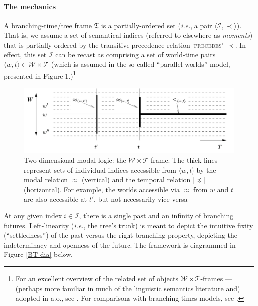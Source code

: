 \documentclass[12pt,dvipsnames]{report}
\begin{document}
\paragraph{The mechanics} A branching-time/tree frame $ \mathfrak T$ is a partially-ordered set (\textit{i.e.}, a pair $\langle \mathcal{I,\prec}\rangle $). That is, we assume a set of semantical indices (referred to elsewhere as \textit{moments}) that is partially-ordered by the transitive precedence relation \textsc{`precedes'} $ \boldsymbol\prec $. In effect, this set $ \mathcal I $ can be recast as comprising a set of world-time pairs $ \langle w,t\rangle\in\mathcal{W\times T} $ (which is assumed in the so-called ``parallel worlds'' model, presented in Figure \ref{KCH-WTframe}.)\footnote{For an excellent overview of the related set of objects $ \mathcal{W\times T} $-frames --- (perhaps more familiar in much of the linguistic semantics literature and) adopted in \citet{Kaufmann2005,Condoravdi2002,Klecha2016a} a.o., see \citet*{Kaufmann2006}. For comparisons with branching times models, see \citealt{Thomason1970,Thomason1984,Rumberg2016}.}


\begin{figure}[b]
	\centering	\caption[$ \mathcal{W\times T}: $Two dimensional modal logic: the Parallel Worlds model]{Two-dimensional modal logic: the $ \mathcal{W\times T} $-frame. The thick lines represent sets of individual indices accessible from $ \langle w,t\rangle $ by the modal relation $ \approx $ (vertical) and the temporal relation [$ \preccurlyeq $] (horizontal). For example, the worlds accessible via $ \approx $ from $ w $ and $ t $ are also accessible at $ t' $, but not necessarily vice versa \citep*[diagram and caption from][95]{Kaufmann2006}}	\label{KCH-WTframe}
	\includegraphics[width=0.8\linewidth]{KCH06-95-WTframe}
	
\end{figure}



At any given index $ i\in\mathcal I $, there is a single past and an infinity of branching futures. Left-linearity (\textit{i.e.}, the tree's trunk) is meant to depict the intuitive fixity (``settledness'') of the past versus the right-branching property, depicting the indeterminacy and openness of the future.
The framework is diagrammed in Figure \ref{BT-dia} below.
\end{document}
